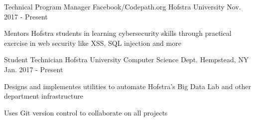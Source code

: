

\begin{cventries}

\cventry
    {Technical Program Manager} %
    {Facebook/Codepath.org} %
    {Hofstra University} %
    {Nov. 2017 - Present} %
    {
      \begin{cvitems} %
        \item {Mentors Hofstra students in learning cybersecurity skills through practical exercise in web security like XSS, SQL injection and more}
      \end{cvitems}
    }

  \cventry
    {Student Technician} %
    {Hofstra University Computer Science Dept.} %
    {Hempstead, NY} %
    {Jan. 2017 - Present} %
    {
      \begin{cvitems} %
        \item {Designs and implementes utilities to automate Hofstra's Big Data Lab and other department infrastructure}
        \item {Uses Git version control to collaborate on all projects}
      \end{cvitems}
    }

\end{cventries}
